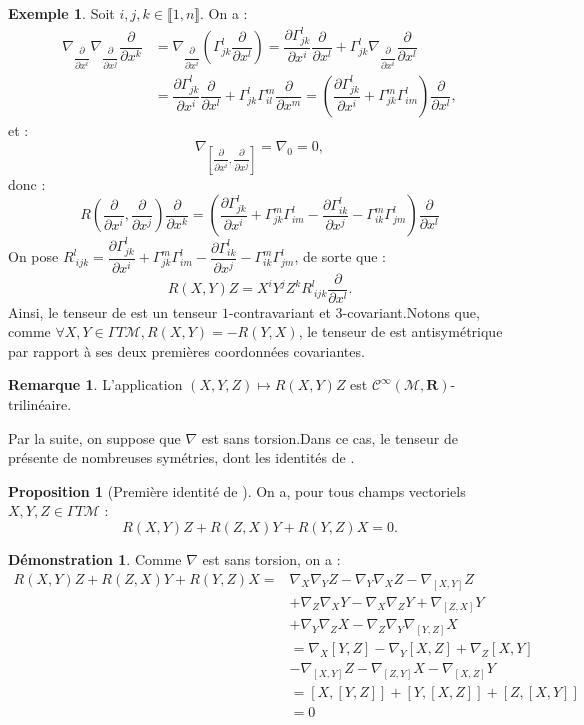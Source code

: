 \documentclass[12pt,a4paper]{article}
\theoremstyle{definition}
\newtheorem{prop}[thm]{Proposition}
\newtheorem{ex}[thm]{Exemple}
\newtheorem{rqe}[thm]{Remarque}
\newtheorem*{dem}{Démonstration}
\begin{document}
\begin{ex}
Soit $i,j,k\in\llbracket 1,n\rrbracket$. On a :
\begin{align*}
\nabla_{\dfrac{\partial}{\partial x^i}}\nabla_{\dfrac{\partial}{\partial x^j}}\dfrac{\partial}{\partial x^k}&=\nabla_{\dfrac{\partial}{\partial x^i}}\left(\Gamma_{jk}^l\dfrac{\partial}{\partial x^l}\right)=\dfrac{\partial\Gamma^l_{jk}}{\partial x^i}\dfrac{\partial}{\partial x^l}+\Gamma_{jk}^l\nabla_{\dfrac{\partial}{\partial x^i}}\dfrac{\partial}{\partial x^l}\\&=\dfrac{\partial\Gamma^l_{jk}}{\partial x^i}\dfrac{\partial}{\partial x^l}+\Gamma_{jk}^l\Gamma_{il}^m\dfrac{\partial}{\partial x^m}=\left(\dfrac{\partial\Gamma^l_{jk}}{\partial x^i}+\Gamma_{jk}^m\Gamma_{im}^l\right)\dfrac{\partial}{\partial x^l},
\end{align*}
et :
$$
\nabla_{\left[\dfrac{\partial}{\partial x^i},\dfrac{\partial}{\partial x^j}\right]}=\nabla_0=0,
$$
donc :
$$
R\left(\dfrac{\partial}{\partial x^i},\dfrac{\partial}{\partial x^j}\right)\dfrac{\partial}{\partial x^k}=\left(\dfrac{\partial\Gamma^l_{jk}}{\partial x^i}+\Gamma_{jk}^m\Gamma_{im}^l-\dfrac{\partial\Gamma^l_{ik}}{\partial x^j}-\Gamma_{ik}^m\Gamma_{jm}^l\right)\dfrac{\partial}{\partial x^l}
$$
On pose $R_{~ijk}^l=\dfrac{\partial\Gamma^l_{jk}}{\partial x^i}+\Gamma_{jk}^m\Gamma_{im}^l-\dfrac{\partial\Gamma^l_{ik}}{\partial x^j}-\Gamma_{ik}^m\Gamma_{jm}^l$, de sorte que :
$$
R(X,Y)Z=X^iY^jZ^kR_{~ijk}^l\dfrac{\partial}{\partial x^l}.
$$
Ainsi, le tenseur de  est un tenseur $1$-contravariant et $3$-covariant.\newline Notons que, comme $\forall X,Y\in\Gamma T\mathcal{M},R(X,Y)=-R(Y,X)$, le tenseur de  est antisymétrique par rapport à ses deux premières coordonnées covariantes.
\begin{rqe}
L'application $(X,Y,Z)\mapsto R(X,Y)Z$ est $\mathcal{C}^\infty(\mathcal{M},\mathbf{R})$-trilinéaire.
\end{rqe}
Par la suite, on suppose que $\nabla$ est sans torsion.\newline Dans ce cas, le tenseur de  présente de nombreuses symétries, dont les identités de .
\begin{prop}[Première identité de ]
On a, pour tous champs vectoriels $X,Y,Z\in\Gamma T\mathcal{M}$ :
$$
R(X,Y)Z+R(Z,X)Y+R(Y,Z)X=0.
$$
\end{prop}
\begin{dem}
Comme $\nabla$ est sans torsion, on a :
\begin{align*}
R(X,Y)Z+R(Z,X)Y+R(Y,Z)X=&\nabla_X\nabla_YZ-\nabla_Y\nabla_XZ-\nabla_{[X,Y]}Z\\&+\nabla_Z\nabla_XY-\nabla_X\nabla_ZY+\nabla_{[Z,X]}Y\\&+\nabla_{Y}\nabla_ZX-\nabla_{Z}\nabla_Y\nabla_{[Y,Z]}X\\&=\nabla_X[Y,Z]-\nabla_Y[X,Z]+\nabla_Z[X,Y]\\&-\nabla_{[X,Y]}Z-\nabla_{[Z,Y]}X-\nabla_{[X,Z]}Y\\&=[X,[Y,Z]]+[Y,[X,Z]]+[Z,[X,Y]]\\&=0

\end{align*}
\end{dem}
\end{ex}
\end{document}
